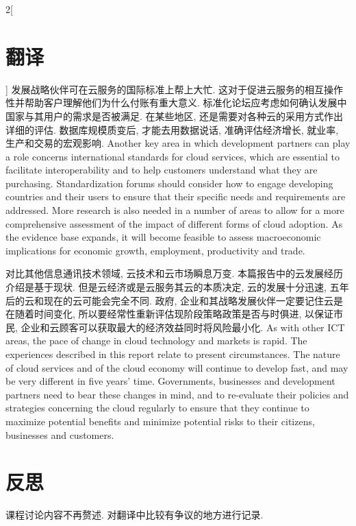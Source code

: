 \documentclass[a4paper, UTF8, 12pt]{article}
\begin{document}
\begin{paracol}{2}[\section{翻译}]
    \switchcolumn*
    发展战略伙伴可在云服务的国际标准上帮上大忙. 这对于促进云服务的相互操作性并帮助客户理解他们为什么付账有重大意义. 标准化论坛应考虑如何确认发展中国家与其用户的需求是否被满足. 在某些地区, 还是需要对各种云的采用方式作出详细的评估. 数据库规模质变后, 才能去用数据说话, 准确评估经济增长, 就业率, 生产和交易的宏观影响.
    \switchcolumn
    Another key area in which development partners can play a role concerns international standards for cloud services, which are essential to facilitate interoperability and to help customers understand what they are purchasing. Standardization forums should consider how to engage developing countries and their users to ensure that their specific needs and requirements are addressed. More research is also needed in a number of areas to allow for a more comprehensive assessment of the impact of different forms of cloud adoption. As the evidence base expands, it will become feasible to assess macroeconomic implications for economic growth, employment, productivity and trade. 

    \switchcolumn*
    对比其他信息通讯技术领域, 云技术和云市场瞬息万变. 本篇报告中的云发展经历介绍是基于现状. 但是云经济或是云服务其云的本质决定, 云的发展十分迅速, 五年后的云和现在的云可能会完全不同. 政府, 企业和其战略发展伙伴一定要记住云是在随着时间变化, 所以要经常性重新评估现阶段策略政策是否与时俱进, 以保证市民, 企业和云顾客可以获取最大的经济效益同时将风险最小化.
    \switchcolumn
    As with other ICT areas, the pace of change in cloud technology and markets is rapid. The experiences described in this report relate to present circumstances. The nature of cloud services and of the cloud economy will continue to develop fast, and may be very different in five years’ time. Governments, businesses and development partners need to bear these changes in mind, and to re-evaluate their policies and strategies concerning the cloud regularly to ensure that they continue to maximize potential benefits and minimize potential risks to their citizens, businesses and customers.

\end{paracol}

\section{反思}

课程讨论内容不再赘述. 对翻译中比较有争议的地方进行记录.
\end{document}
